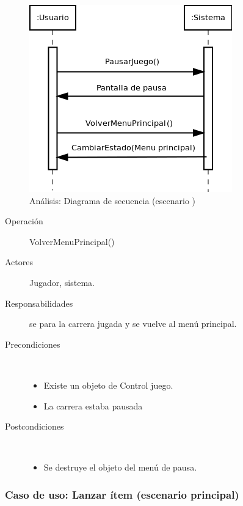 \begin{figure}[H] 
  \label{secuencia_pausar3}
  \begin{center}
    \includegraphics[scale=0.6]{imagenes/analisis/secuencia_pausar3.png}
  \end{center}
  \caption{Análisis: Diagrama de secuencia (escenario )}
\end{figure}

\begin{description}
    \item [Operación] VolverMenuPrincipal()
    \item [Actores] Jugador, sistema.
    \item [Responsabilidades] se para la carrera jugada y se vuelve al menú principal.
    \item [Precondiciones] $\quad$
        \begin{itemize}
            \item Existe un objeto de Control juego.
            \item La carrera estaba pausada
        \end{itemize}
    \item [Postcondiciones] $\quad$
        \begin{itemize}
            \item Se destruye el objeto del menú de pausa.
        \end{itemize}
\end{description}

\subsubsection{Caso de uso: Lanzar ítem (escenario principal)}

